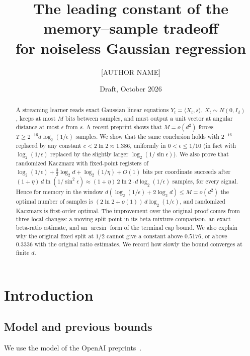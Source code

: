 \documentclass[11pt]{article}
\title{The leading constant of the memory--sample tradeoff\\ for noiseless Gaussian regression}
\author{[AUTHOR NAME]}
\date{Draft, October 2026}
\theoremstyle{definition}
\theoremstyle{remark}
\newcommand{\ip}[2]{\langle #1,#2\rangle}
\begin{document}
\maketitle

\begin{abstract}
A streaming learner reads exact Gaussian linear equations
\(Y_t=\ip{X_t}{s}\), \(X_t\sim N(0,I_d)\), keeps at most \(M\) bits
between samples, and must output a unit vector at angular distance at
most \(\epsilon\) from \(s\). A recent preprint shows that \(M=o(d^2)\)
forces \(T\ge 2^{-16}d\log_2(1/\epsilon)\) samples. We show that the
same conclusion holds with \(2^{-16}\) replaced by any constant
\(c<2\ln 2\approx1.386\), uniformly in \(0<\epsilon\le 1/10\) (in fact with
\(\log_2(1/\epsilon)\) replaced by the slightly larger \(\log_2(1/\sin\epsilon)\)). We also
prove that randomized Kaczmarz with fixed-point registers of
\(\log_2(1/\epsilon)+\tfrac32\log_2 d+\log_2(1/\eta)+O(1)\) bits per coordinate
succeeds after \((1+\eta)\,d\ln(1/\sin^2\epsilon)\approx(1+\eta)\,2\ln2\cdot d\log_2(1/\epsilon)\) samples, for every signal.
Hence for memory in the window
\(d(\log_2(1/\epsilon)+2\log_2 d)\le M=o(d^2)\) the optimal number of
samples is \((2\ln 2+o(1))\,d\log_2(1/\epsilon)\), and randomized
Kaczmarz is first-order optimal. The improvement over the
original proof comes from three local changes: a moving split point in
its beta-mixture comparison, an exact beta-ratio estimate, and an
\(\arcsin\) form of the terminal cap bound. We also explain why the original fixed split at \(1/2\)
cannot give a constant above \(0.5176\), or above \(0.3336\) with the original
ratio estimates. We record how slowly the bound converges at finite
\(d\).
\end{abstract}

\section{Introduction}

\subsection{Model and previous bounds}
We use the model of the OpenAI preprints~\cite{OAIsub,OAImem}.
\end{document}
